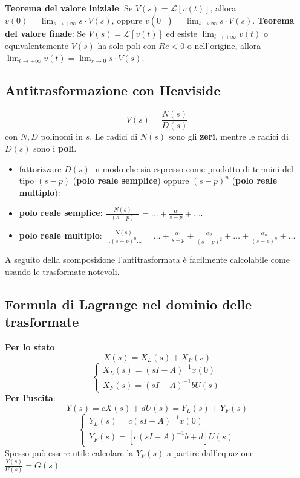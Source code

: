     \newline
    \textbf{Teorema del valore iniziale}:\newline
    Se $V(s) = \mathcal{L}[v(t)]$, allora $v(0) = \lim_{s\rightarrow +\infty} s \cdot V(s)$, oppure $v(0^+) = \lim_{s\rightarrow \infty}s \cdot V(s)$.\newline
    \newline
    \textbf{Teorema del valore finale}:\newline
    Se $V(s) = \mathcal{L}[v(t)]$ ed esiste $\lim_{t\rightarrow +\infty} v(t)$ o equivalentemente $V(s)$ ha solo poli con $Re< 0$ o nell'origine, allora $\lim_{t\rightarrow +\infty} v(t) = \lim_{s\rightarrow 0} s \cdot V(s)$.
    \subsection{Antitrasformazione con Heaviside}
    \[
        V(s) = \frac{N(s)}{D(s)}
    \]
    con $N,D$ polinomi in $s$.\newline
    Le radici di $N(s)$ sono gli \textbf{zeri}, mentre le radici di $D(s)$ sono i \textbf{poli}.\newline
    \begin{itemize}
        \item fattorizzare $D(s)$ in modo che sia espresso come prodotto di termini del tipo $(s-p)$ (\textbf{polo reale semplice}) oppure $(s-p)^n$ (\textbf{polo reale multiplo}):
        \item \textbf{polo reale semplice}: $\frac{N(s)}{\dots(s-p)\dots} = \dots + \frac{\alpha}{s-p} + \dots$.
        \item \textbf{polo reale multiplo}: $\frac{N(s)}{\dots (s-p)^n \dots} = \dots + \frac{\alpha_1}{s-p} + \frac{\alpha_2}{(s-p)^2} + \dots + \frac{\alpha_n}{(s-p)^n} + \dots$
    \end{itemize}
    A seguito della scomposizione l'antitrasformata è facilmente calcolabile come usando le trasformate notevoli.
    \subsection{Formula di Lagrange nel dominio delle trasformate}
    \textbf{Per lo stato}:
    \[
        X(s) = X_L(s) + X_F(s)
    \]
    \[
        \begin{cases}
            X_L(s) = (sI-A)^{-1} x(0)\\
            X_F(s) = (sI-A) ^{-1} b U(s)
        \end{cases}
    \]
    \textbf{Per l'uscita}:
    \[
        Y(s) = cX(s) + dU(s) = Y_L(s) + Y_F(s)
    \]
    \[
        \begin{cases}
            Y_L(s) = c(sI-A)^{-1} x(0)\\
            Y_F(s) = [c(sI-A)^{-1} b + d]U(s)
        \end{cases}
    \]
    Spesso può essere utile calcolare la $Y_F(s)$ a partire dall'equazione $\frac{Y(s)}{U(s)} = G(s)$
